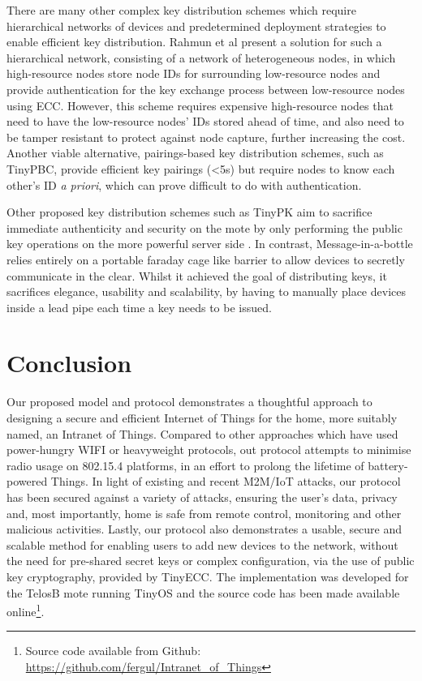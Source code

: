\documentclass[conference]{./sty/IEEEtran}
\begin{document}
There are many other complex key distribution schemes which require hierarchical networks of devices \cite{MizanurRahman2010858,Shi2013235} and predetermined deployment strategies to enable efficient key distribution. Rahmun et al present a solution for such a hierarchical network\cite{MizanurRahman2010858}, consisting of a network of heterogeneous nodes, in which high-resource nodes store node IDs for surrounding low-resource nodes and provide authentication for the key exchange process between low-resource nodes using ECC. However, this scheme requires expensive high-resource nodes that need to have the low-resource nodes' IDs stored ahead of time, and also need to be tamper resistant to protect against node capture, further increasing the cost. Another viable alternative, pairings-based key distribution schemes, such as TinyPBC\cite{TinyPBC}, provide efficient key pairings (\textless5s) but require nodes to know each other's ID \textit{a priori}, which can prove difficult to do with authentication. 

Other proposed key distribution schemes such as TinyPK aim to sacrifice immediate authenticity and security on the mote by only performing the public key operations on the more powerful server side \cite{TinyPK}. In contrast, Message-in-a-bottle \cite{MessageBottle} relies entirely on a portable faraday cage like barrier to allow devices to secretly communicate in the clear. Whilst it achieved the goal of distributing keys, it sacrifices elegance, usability and scalability, by having to manually place devices inside a lead pipe each time a key needs to be issued.

\section{Conclusion}
\label{sec:conclusion}
Our proposed model and protocol demonstrates a thoughtful approach to designing a secure and efficient Internet of Things for the home, more suitably named, an Intranet of Things. Compared to other approaches which have used power-hungry WIFI or heavyweight protocols, out protocol attempts to minimise radio usage on 802.15.4 platforms, in an effort to prolong the lifetime of battery-powered Things. In light of existing and recent M2M/IoT attacks, our protocol has been secured against a variety of attacks, ensuring the user's data, privacy and, most importantly, home is safe from remote control, monitoring and other malicious activities. Lastly, our protocol also demonstrates a usable, secure and scalable method for enabling users to add new devices to the network, without the need for pre-shared secret keys or complex configuration, via the use of public key cryptography, provided by TinyECC. The implementation was developed for the TelosB mote running TinyOS and the source code has been made available online\footnote{Source code available from Github: \url{https://github.com/fergul/Intranet_of_Things}}.
\end{document}
